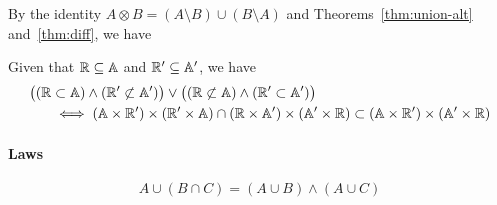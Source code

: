 By the identity $A \otimes B = (A \setminus B) \cup (B \setminus A)$ 
and Theorems~\ref{thm:union-alt} and~\ref{thm:diff}, we have	
\begin{theorem}  \label{thm:sym-diff-alt}
  Given that $\mathbb{R} \subseteq \mathbb{A}$ and $\mathbb{R}' \subseteq \mathbb{A}'$, we have
  \begin{align*}
    \big((\mathbb{R} &\subset \mathbb{A}) \land (\mathbb{R}' \not\subset \mathbb{A}')\big) \lor 
    \big((\mathbb{R} \not\subset \mathbb{A}) \land (\mathbb{R}' \subset \mathbb{A}')\big) \\
    & \iff (\mathbb{A} \times \mathbb{R}') \times (\mathbb{R}' \times \mathbb{A}) \cap (\mathbb{R} \times \mathbb{A}') \times (\mathbb{A}' \times \mathbb{R}) \subset (\mathbb{A} \times \mathbb{R}') \times (\mathbb{A}' \times \mathbb{R})
  \end{align*}
\end{theorem}
\paragraph{Laws}

\begin{theorem}
  \[
    A \cup (B \cap C) = (A \cup B) \land (A \cup C)
  \]
\end{theorem}
